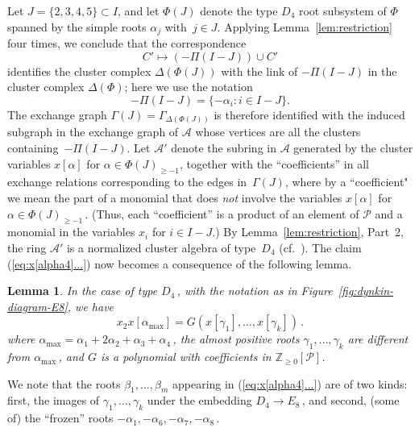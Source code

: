 \documentclass[letterpaper]{amsart}
\numberwithin{equation}{section}
\newtheorem{lemma}[theorem]{Lemma}
\theoremstyle{definition}
\def\AA{\mathcal{A}}
\def\xx{\mathbf{x}}
\begin{document}
Let $J=\{2,3,4,5\}\subset I$, 
and let $\Phi(J)$ denote the type $D_4$ root subsystem of $\Phi$ 
spanned by the simple roots $\alpha_j$ with~$j\in J$. 
Applying Lemma~\ref{lem:restriction} four times, 
we conclude that the correspondence 
\[ 
C' \mapsto (-\Pi(I-J)) \cup C' 
\] 
identifies the cluster complex $\Delta(\Phi(J))$ 
with the link of $-\Pi(I-J)$ in 
the cluster complex $\Delta(\Phi)$; 
here we use the notation 
\[ 
-\Pi(I-J) = \{-\alpha_i: i \in I - J\}. 
\] 
The exchange graph $\Gamma(J) = \Gamma_{\Delta(\Phi(J))}$ 
is therefore identified with the induced subgraph in the exchange 
graph of $\AA$ whose vertices are all the clusters 
containing~$-\Pi(I-J)$. 
Let $\AA'$ denote the subring in $\AA$ generated by the cluster variables 
$x[\alpha]$ for $\alpha \in \Phi(J)_{\geq -1}$, 
together with the ``coefficients'' in all exchange relations corresponding 
to the edges in~$\Gamma(J)$, where by a ``coefficient" 
we mean the part of a monomial that does \emph{not} involve the 
variables $x[\alpha]$ for $\alpha \in \Phi(J)_{\geq -1}\,$. 
(Thus, each ``coefficient'' is a product of an element of $\mathcal{P}$ 
and a monomial in the variables $x_i$ for $i \in I - J$.) 
By Lemma~\ref{lem:restriction}, Part~2, the ring $\AA'$ 
is a normalized cluster algebra of type~$D_4$ 
(cf.\ \cite[Proposition~2.6]{fz-clust1}). 
The claim (\ref{eq:x[alpha4]...}) now becomes a consequence of the following lemma. 
 
\begin{lemma} 
In %
the case of type $D_4\,$, with the notation as in 
Figure~\ref{fig:dynkin-diagram-E8}, we have 
\[ 
x_2 x[\alpha_{\max}] 
=G(x[\gamma_1],\dots,x[\gamma_k]) \,. 
\] 
where $\alpha_{\max}=\alpha_1+2\alpha_2+\alpha_3+\alpha_4\,$, the 
almost positive roots $\gamma_1,\dots,\gamma_k$ are different from 
$\alpha_{\max}\,$, 
and $G$ is a polynomial with coefficients in 
$\mathbb{Z}_{\geq 0}[\mathcal{P}]$. 
\end{lemma} 
 
We note that the roots $\beta_1,\dots,\beta_m$ appearing in 
(\ref{eq:x[alpha4]...}) are of two kinds: first, the images of 
$\gamma_1,\dots,\gamma_k$ under the embedding $D_4\to E_8\,$, 
and second, (some of) the ``frozen'' roots 
$-\alpha_1,-\alpha_6,-\alpha_7,-\alpha_8\,$. 
 
\end{document}
